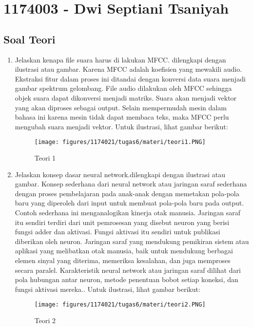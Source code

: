 \section{1174003 - Dwi Septiani Tsaniyah}
\subsection{Soal Teori}
\begin{enumerate}

	\item Jelaskan kenapa file suara harus di lakukan MFCC. dilengkapi dengan ilustrasi atau gambar.
	\hfill\break
	Karena MFCC adalah koefisien yang mewakili audio. Ekstraksi fitur dalam proses ini ditandai dengan konversi data suara menjadi gambar spektrum gelombang. File audio dilakukan oleh MFCC sehingga objek suara dapat dikonversi menjadi matriks. Suara akan menjadi vektor yang akan diproses sebagai output. Selain mempermudah mesin dalam bahasa ini karena mesin tidak dapat membaca teks, maka MFCC perlu mengubah suara menjadi vektor. Untuk ilustrasi, lihat gambar berikut: 

	\begin{figure}[H]
	\centering
		\texttt{[image: figures/1174021/tugas6/materi/teori1.PNG]}
		\caption{Teori 1}
	\end{figure}

	\item Jelaskan konsep dasar neural network.dilengkapi dengan ilustrasi atau gambar.
	\hfill\break
	Konsep sederhana dari neural network atau jaringan saraf sederhana dengan proses pembelajaran pada anak-anak dengan memetakan pola-pola baru yang diperoleh dari input untuk membuat pola-pola baru pada output. Contoh sederhana ini menganalogikan kinerja otak manusia. Jaringan saraf itu sendiri terdiri dari unit pemrosesan yang disebut neuron yang berisi fungsi adder dan aktivasi. Fungsi aktivasi itu sendiri untuk publikasi diberikan oleh neuron. Jaringan saraf yang mendukung pemikiran sistem atau aplikasi yang melibatkan otak manusia, baik untuk mendukung berbagai elemen sinyal yang diterima, memeriksa kesalahan, dan juga memproses secara paralel. Karakteristik neural network atau jaringan saraf dilihat dari pola hubungan antar neuron, metode penentuan bobot setiap koneksi, dan fungsi aktivasi mereka.. Untuk ilustrasi, lihat gambar berikut: 

	\begin{figure}[H]
	\centering
		\texttt{[image: figures/1174021/tugas6/materi/teori2.PNG]}
		\caption{Teori 2}
	\end{figure}
	

\end{enumerate}
